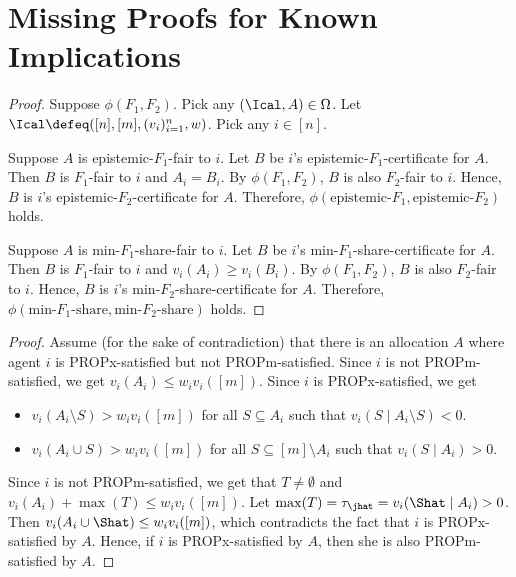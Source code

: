 \section{Missing Proofs for Known Implications}
\label{sec:known-impls-extra}

\begin{proof}
Suppose $\phi(F_1, F_2)$.
Pick any $(\Ical, A) \in \Omega$.
Let $\Ical \defeq ([n], [m], (v_i)_{i=1}^n, w)$.
Pick any $i \in [n]$.

Suppose $A$ is epistemic-$F_1$-fair to $i$.
Let $B$ be $i$'s epistemic-$F_1$-certificate for $A$.
Then $B$ is $F_1$-fair to $i$ and $A_i = B_i$.
By $\phi(F_1, F_2)$, $B$ is also $F_2$-fair to $i$.
Hence, $B$ is $i$'s epistemic-$F_2$-certificate for $A$.
Therefore, $\phi(\textrm{epistemic-}F_1, \textrm{epistemic-}F_2)$ holds.

Suppose $A$ is min-$F_1$-share-fair to $i$.
Let $B$ be $i$'s min-$F_1$-share-certificate for $A$.
Then $B$ is $F_1$-fair to $i$ and $v_i(A_i) \ge v_i(B_i)$.
By $\phi(F_1, F_2)$, $B$ is also $F_2$-fair to $i$.
Hence, $B$ is $i$'s min-$F_2$-share-certificate for $A$.
Therefore, $\phi(\textrm{min-}F_1\textrm{-share}, \textrm{min-}F_2\textrm{-share})$ holds.
\end{proof}

\begin{proof}
Assume (for the sake of contradiction) that there is an allocation $A$ where
agent $i$ is PROPx-satisfied but not PROPm-satisfied.
%
Since $i$ is not PROPm-satisfied, we get $v_i(A_i) \le w_iv_i([m])$.
Since $i$ is PROPx-satisfied, we get

\begin{itemize}
\item $v_i(A_i \setminus S) > w_iv_i([m])$ for all $S \subseteq A_i$ such that
    $v_i(S \mid A_i \setminus S) < 0$.
\item $v_i(A_i \cup S) > w_iv_i([m])$ for all $S \subseteq [m] \setminus A_i$
    such that $v_i(S \mid A_i) > 0$.
\end{itemize}

Since $i$ is not PROPm-satisfied, we get that $T \neq \emptyset$ and $v_i(A_i) + \max(T) \le w_iv_i([m])$.
Let $\max(T) = \tau_{\jhat} = v_i(\Shat \mid A_i) > 0$.
Then $v_i(A_i \cup \Shat) \le w_iv_i([m])$, which contradicts the fact that
$i$ is PROPx-satisfied by $A$.
Hence, if $i$ is PROPx-satisfied by $A$, then she is also PROPm-satisfied by $A$.
\end{proof}

